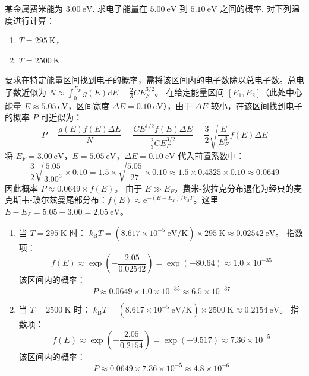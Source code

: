 \begin{exercise}\label{ex:27.4}
某金属费米能为 $3.00 \ \mathrm{eV}$. 求电子能量在 $5.00 \ \mathrm{eV}$ 到 $5.10 \ \mathrm{eV}$ 之间的概率. 对下列温度进行计算：
\begin{enumerate}
  \item[(a)] $T = 295 \ \mathrm{K}$，
  \item[(b)] $T = 2500 \ \mathrm{K}$.
\end{enumerate}
\end{exercise}
\begin{solution}
要求在特定能量区间找到电子的概率，需将该区间内的电子数除以总电子数。总电子数近似为 $N \approx \int_0^{E_F} g(E) \mathrm{d}E = \frac{2}{3} C E_F^{3/2}$。
在给定能量区间 $[E_1, E_2]$（此处中心能量 $E \approx 5.05 \ \mathrm{eV}$，区间宽度 $\Delta E = 0.10 \ \mathrm{eV}$），由于 $\Delta E$ 较小，在该区间找到电子的概率 $P$ 可近似为：
$$ P = \frac{g(E) f(E) \Delta E}{N} = \frac{C E^{1/2} f(E) \Delta E}{\frac{2}{3} C E_F^{3/2}} = \frac{3}{2} \sqrt{\frac{E}{E_F^3}} f(E) \Delta E $$
将 $E_F = 3.00 \ \mathrm{eV}$，$E = 5.05 \ \mathrm{eV}$，$\Delta E = 0.10 \ \mathrm{eV}$ 代入前置系数中：
$$ \frac{3}{2} \sqrt{\frac{5.05}{3.00^3}} \times 0.10 = 1.5 \times \sqrt{\frac{5.05}{27}} \times 0.10 \approx 1.5 \times 0.4325 \times 0.10 \approx 0.0649 $$
因此概率 $P \approx 0.0649 \times f(E)$。
由于 $E \gg E_F$，费米-狄拉克分布退化为经典的麦克斯韦-玻尔兹曼尾部分布：$f(E) \approx \mathrm{e}^{-(E - E_F)/k_{\mathrm{B}} T}$。这里 $E - E_F = 5.05 - 3.00 = 2.05 \ \mathrm{eV}$。

\begin{enumerate}
    \item[(a)] 当 $T = 295 \ \mathrm{K}$ 时：
    $k_{\mathrm{B}} T = (8.617 \times 10^{-5} \ \mathrm{eV/K}) \times 295 \ \mathrm{K} \approx 0.02542 \ \mathrm{eV}$。
    指数项：
    $$ f(E) \approx \exp\left(-\frac{2.05}{0.02542}\right) = \exp(-80.64) \approx 1.0 \times 10^{-35} $$
    该区间内的概率：
    $$ P \approx 0.0649 \times 1.0 \times 10^{-35} \approx 6.5 \times 10^{-37} $$

    \item[(b)] 当 $T = 2500 \ \mathrm{K}$ 时：
    $k_{\mathrm{B}} T = (8.617 \times 10^{-5} \ \mathrm{eV/K}) \times 2500 \ \mathrm{K} \approx 0.2154 \ \mathrm{eV}$。
    指数项：
    $$ f(E) \approx \exp\left(-\frac{2.05}{0.2154}\right) = \exp(-9.517) \approx 7.36 \times 10^{-5} $$
    该区间内的概率：
    $$ P \approx 0.0649 \times 7.36 \times 10^{-5} \approx 4.8 \times 10^{-6} $$
\end{enumerate}
\end{solution}


